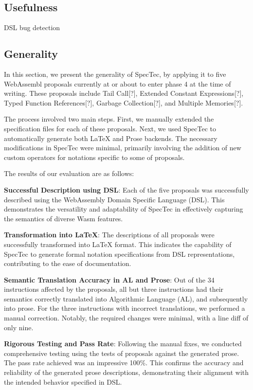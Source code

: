 \subsection{Usefulness}
DSL bug detection

\subsection{Generality}
In this section, we present the generality of SpecTec, by applying it to five
WebAssembl proposals currently at or about to enter phase 4 at the time of
writing. These proposals include Tail Call[?], Extended Constant
Expressions[?], Typed Function References[?], Garbage Collection[?], and
Multiple Memories[?].

The process involved two main steps. First, we manually extended the
specification files for each of these proposals. Next, we used SpecTec to
automatically generate both LaTeX and Prose backends. The necessary
modifications in SpecTec were minimal, primarily involving the addition of new
custom operators for notations specific to some of proposals.

The results of our evaluation are as follows:

\textbf{Successful Description using DSL}: Each of the five proposals was
successfully described using the WebAssembly Domain Specific Language (DSL).
This demonstrates the versatility and adaptability of SpecTec in effectively
capturing the semantics of diverse Wasm features.

\textbf{Transformation into LaTeX}: The descriptions of all proposals were
successfully transformed into LaTeX format. This indicates the capability of
SpecTec to generate formal notation specifications from DSL representations,
contributing to the ease of documentation.

\textbf{Semantic Translation Accuracy in AL and Prose}: Out of the 34
instructions affected by the proposals, all but three instructions had their
semantics correctly translated into Algorithmic Language (AL), and subsequently
into prose. For the three instructions with incorrect translations, we
performed a manual correction. Notably, the required changes were minimal, with
a line diff of only nine.

\textbf{Rigorous Testing and  Pass Rate}: Following the manual
fixes, we conducted comprehensive testing using the tests of proposals against
the generated prose. The pass rate achieved was an impressive 100\%. This
confirms the accuracy and reliability of the generated prose descriptions,
demonstrating their alignment with the intended behavior specified in DSL.

